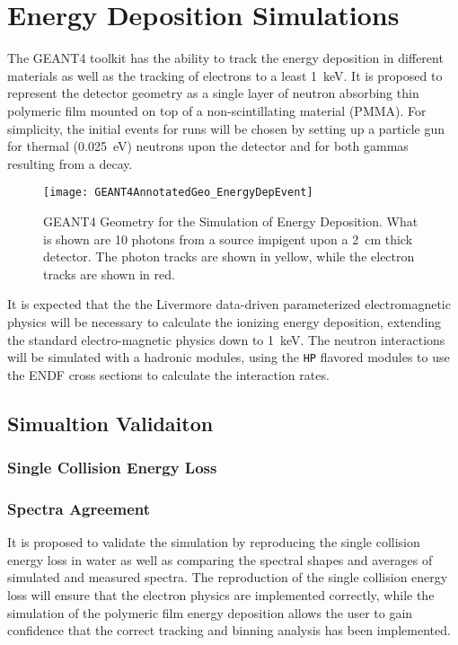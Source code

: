 \section{Energy Deposition Simulations}

The GEANT4 toolkit has the ability to track the energy deposition in different materials as well as the tracking of electrons to a least \SI{1}{\keV}\cite{agostinelli_geant4simulation_2003}.
It is proposed to represent the detector geometry as a single layer of neutron absorbing thin polymeric film mounted on top of a non-scintillating material (PMMA).
For simplicity, the initial events for runs will be chosen by setting up a particle gun for thermal (\SI{0.025}{\eV}) neutrons upon the detector and for both gammas resulting from a  decay.
\begin{figure}
  \texttt{[image: GEANT4AnnotatedGeo\_EnergyDepEvent]}
	\caption[GEANT4 Energy Depostion Geometry]{GEANT4 Geometry for the Simulation of Energy Deposition. What is shown are 10 photons from a  source impigent upon a \SI{2}{\cm} thick detector.  The photon tracks are shown in yellow, while the electron tracks are shown in red.}
	\label{fig:EDepSimGeo}
\end{figure}
It is expected that the the Livermore data-driven parameterized electromagnetic physics will be necessary to calculate the ionizing energy deposition, extending the standard electro-magnetic physics down to \SI{1}{\kilo\eV}.
The neutron interactions will be simulated with a hadronic modules, using the \verb+HP+ flavored modules to use the ENDF cross sections to calculate the interaction rates.

\subsection{Simualtion Validaiton}

\subsubsection{Single Collision Energy Loss}

\subsubsection{Spectra Agreement}
It is proposed to validate the simulation by reproducing the single collision energy loss in water as well as comparing  the spectral shapes and averages of simulated and measured spectra.
The reproduction of the single collision energy loss will ensure that the electron physics are implemented correctly, while the simulation of the polymeric film energy deposition allows the user to gain confidence that the correct tracking and binning analysis has been implemented.


